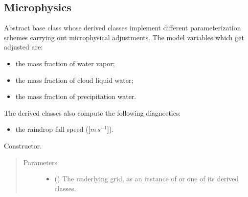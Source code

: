 \documentclass[letterpaper,10pt,english]{sphinxmanual}
\begin{document}
\subsection{Microphysics}
\label{\detokenize{api:microphysics}}

\begin{fulllineitems}
\label{\detokenize{api:parameterizations.adjustments.AdjustmentMicrophysics}}
Abstract base class whose derived classes implement different parameterization schemes carrying out
microphysical adjustments. The model variables which get adjusted are:
\begin{itemize}
\item {} 
the mass fraction of water vapor;

\item {} 
the mass fraction of cloud liquid water;

\item {} 
the mass fraction of precipitation water.

\end{itemize}

The derived classes also compute the following diagnostics:
\begin{itemize}
\item {} 
the raindrop fall speed ({[}\(m \, s^{-1}\){]}).

\end{itemize}

\begin{fulllineitems}
\label{\detokenize{api:parameterizations.adjustments.AdjustmentMicrophysics.__init__}}
Constructor.
\begin{quote}\begin{description}
\item[{Parameters}] \leavevmode\begin{itemize}
\item {} 
 () \textendash{} The underlying grid, as an instance of {\hyperref[\detokenize{api:grids.grid_xyz.GridXYZ}]{}} or one of its derived classes.


\end{itemize}
\end{description}
\end{quote}
\end{fulllineitems}
\end{fulllineitems}
\end{document}
